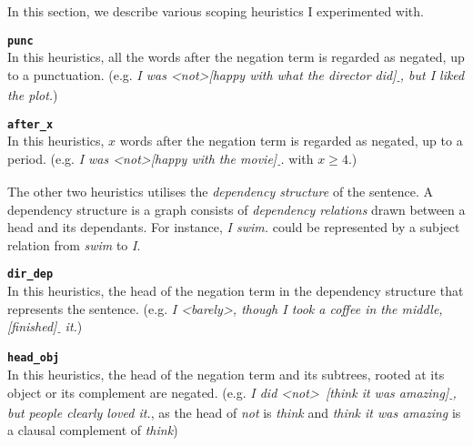 In this section, we describe various scoping heuristics I experimented with.

{\bf \texttt{punc}}\\
In this heuristics, all the words after the negation term is regarded as negated, up to a punctuation. (e.g. \textit{I was \textless not\textgreater [happy with what the director did]\textsubscript{-}, but I liked the plot.})

{\bf \texttt{after\_x}}\\
In this heuristics, $x$ words after the negation term is regarded as negated, up to a period. (e.g. \textit{I was \textless not\textgreater [happy with the movie]\textsubscript{-}.} with $x \geq 4$.)

The other two heuristics utilises the \emph{dependency structure} of the sentence. A dependency structure is a graph consists of \emph{dependency relations} drawn between a head and its dependants. For instance, \textit{I swim.} could be represented by a subject relation from \textit{swim} to \textit{I}.

{\bf \texttt{dir\_dep}}\\
In this heuristics, the head of the negation term in the dependency structure that represents the sentence. (e.g. \textit{I \textless barely\textgreater, though I took a coffee in the middle, [finished]\textsubscript{-} it.})

{\bf \texttt{head\_obj}}\\
In this heuristics, the head of the negation term and its subtrees, rooted at its object or its complement are negated. (e.g. \textit{I did \textless not\textgreater\ [think it was amazing]\textsubscript{-}, but people clearly loved it.}, as the head of \textit{not} is \textit{think} and \textit{think it was amazing} is a clausal complement of \textit{think})

